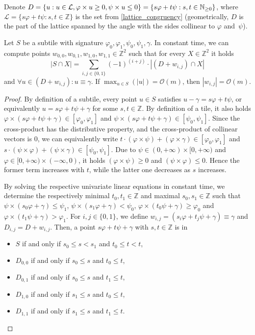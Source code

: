 \documentclass[twoside,leqno]{article}
\let\Cref\cref
\renewcommand{\O}{\mathcal{O}}
\renewcommand{\L}{\mathcal{L}}
\renewcommand{\phi}{\varphi}
\newcommand{\set}[1]{\left\lbrace #1 \right\rbrace}
\newcommand{\absolute}[1]{\left\lvert#1\right\rvert}
\begin{document}
Denote $D = \set{u : u \in \L, \h{u} \ge 0, \s{u} \le 0} = \{ s\phi + t\psi : s,t \in \mathbb N_{\geq 0}\}$, where $\L = \{ s\phi + t\psi : s,t \in \mathbb Z\}$ is the set from \Cref{lattice_congruency} (geometrically, $D$ is the part of the lattice spanned by the angle with the sides collinear to $\phi$ and~$\psi$).

\begin{lemma}\label{primitive}
Let $S$ be a subtile with signature $\phi_0, \phi_1, \psi_0, \psi_1, \gamma$. In constant time, we can compute points $w_{0,0},w_{0,1},w_{1,0},w_{1,1} \in \mathbb Z^2$ such that for every $X \in \mathbb Z^2$ it holds
\[ \absolute{S \cap X} = \sum_{i,j \in \{0,1\}} (-1)^{(i+j)} \cdot \absolute{(D + w_{i,j}) \cap X}\]
and $\forall u \in (D + w_{i,j}) : u \equiv \gamma$. If $\max_{u \in S}(\absolute{u}) = \O(m)$, then $\absolute{w_{i,j}} = \O(m)$.

\begin{proof}
By definition of a subtile, every point $u \in S$ satisfies $u - \gamma = s\phi + t\psi$, or equivalently $u = s\phi + t\psi + \gamma$ for some $s,t\in\mathbb Z$. 
By definition of a tile, it also holds $\phi \times (s\phi + t\psi + \gamma) \in [\phi_0, \phi_1]$ and $\psi \times (s\phi + t\psi + \gamma) \in [\psi_0, \psi_1]$. Since the cross-product has the distributive property, and the cross-product of collinear vectors is $0$, we can equivalently write $t \cdot (\phi \times \psi) + (\phi \times \gamma) \in [\phi_0, \phi_1]$ and $s \cdot (\psi \times \phi) + (\psi \times \gamma) \in [\psi_0, \psi_1]$. 
Due to $\psi \in (0, +\infty) \times [0, +\infty)$ and $\phi \in [0, +\infty) \times (-\infty, 0)$, it holds $(\phi \times \psi) \geq 0$ and $(\psi \times \phi) \leq 0$. Hence the former term increases with $t$, while the latter one decreases as $s$ increases.

By solving the respective univariate linear equations in constant time, we determine the respectively minimal $t_0, t_1 \in \mathbb Z$ and maximal $s_0, s_1 \in \mathbb Z$ such that $\psi \times (s_0\phi + \gamma) \leq \psi_1$, $\psi \times (s_1\phi + \gamma) < \psi_0$, $\phi \times (t_0\psi + \gamma) \geq \phi_0$ and $\phi \times (t_1\psi + \gamma) > \phi_1$.
For $i,j \in \{0, 1\}$, we define $w_{i, j} = (s_i\phi + t_j\psi + \gamma) \equiv \gamma$ and $D_{i,j} = D + w_{i,j}$. 
Then, a point $s\phi + t\psi + \gamma$ with $s,t \in \mathbb Z$ is in 
\begin{itemize}
	\item $S$ if and only if $s_0 \leq s < s_1$ and $t_0 \leq t < t$, 
	\item $D_{0, 0}$ if and only if $s_0 \leq s$ and $t_0 \leq t$, 
	\item $D_{0, 1}$ if and only if $s_0 \leq s$ and $t_1 \leq t$, 
	\item $D_{1, 0}$ if and only if $s_1 \leq s$ and $t_0 \leq t$, 
	\item $D_{1, 1}$ if and only if $s_1 \leq s$ and $t_1 \leq t$.
\end{itemize}


\end{proof}
\end{lemma}
\end{document}
